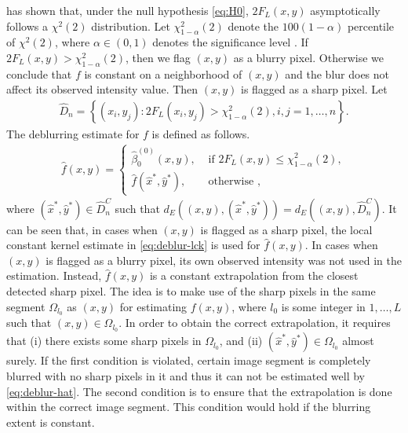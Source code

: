 \citet{kang2020consistent} has shown that, under the null hypothesis \eqref{eq:H0}, \(2F_L(x,y)\) asymptotically follows a \(\chi^2(2)\) distribution. Let \(\chi^2_{1-\alpha}(2)\) denote the \(100(1-\alpha)\) percentile of \(\chi^2(2)\), where \(\alpha\in(0,1)\) denotes the significance level . If \(2F_L(x,y) > \chi^2_{1-\alpha}(2)\), then we flag \((x,y)\) as a blurry pixel. Otherwise we conclude that \(f\) is constant on a neighborhood of \((x,y)\) and the blur does not affect its observed intensity value. Then \((x,y)\) is flagged as a sharp pixel. Let
\begin{align}
  \label{eq:blurry-pixel}
  \widehat{D}_n = \left\{ (x_i, y_j): 2F_L(x_i, y_j) > \chi^2_{1-\alpha}(2), i, j = 1, \ldots, n \right\}. 
\end{align}
The deblurring estimate for \(f\) is defined as follows.
\begin{align}
  \label{eq:deblur-hat}
  \widehat{f}(x,y) =
  \begin{cases}
    \widehat{\beta}_0^{(0)}(x, y), & \text{ if } 2F_L(x,y) \leq \chi^2_{1-\alpha}(2), \\
    \widehat{f}(\widehat{x}^*, \widehat{y}^*), & \text{ otherwise },
  \end{cases}
\end{align}
where \((\widehat{x}^*, \widehat{y}^*) \in \widehat{D}_n^C\) such that \(d_E((x,y), (\widehat{x}^*, \widehat{y}^*)) = d_E((x,y), \widehat{D}^C_n)\). It can be seen that, in cases when \((x, y)\) is flagged as a sharp pixel, the local constant kernel estimate in \eqref{eq:deblur-lck} is used for \(\widehat{f}(x,y)\). In cases when \((x, y)\) is flagged as a blurry pixel, its own observed intensity was not used in the estimation. Instead, \(\widehat{f}(x,y)\) is a constant extrapolation from the closest detected sharp pixel. The idea is to make use of the sharp pixels in the same segment \(\Omega_{l_0}\) as \((x,y)\) for estimating \(f(x,y)\), where \(l_0\) is some integer in \(1, \ldots, L\) such that \((x,y)\in \Omega_{l_0}\). In order to obtain the correct extrapolation, it requires that (i) there exists some sharp pixels in \(\Omega_{l_0}\), and (ii) \((\widehat{x}^*, \widehat{y}^*) \in \Omega_{l_0}\) almost surely. If the first condition is violated, certain image segment is completely blurred with no sharp pixels in it and thus it can not be estimated well by \eqref{eq:deblur-hat}. The second condition is to ensure that the extrapolation is done within the correct image segment. This condition would hold if the blurring extent is constant.

